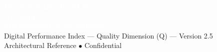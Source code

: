 \documentclass[11pt,a4paper]{article}
\begin{document}
\vspace{1cm}
\begin{tcolorbox}[enhanced, colback=dpiblue, colframe=dpiblue, boxrule=0pt, arc=2mm]
\begin{center}
\textcolor{white}{\textbf{\Large Document Developed By}}\\[0.15cm]
\textcolor{white}{\textbf{\Large AI Team}}\\[0.15cm]
\textcolor{white}{\textbf{\Large Malkapurapu Sivamanikanta}}\\[0.3cm]
\textcolor{dpicloud}{\small Digital Performance Index --- Quality Dimension (Q) --- Version 2.5}\\[0.1cm]
\textcolor{dpicloud}{\small Architectural Reference $\bullet$ Confidential}
\end{center}
\end{tcolorbox}
\end{document}
